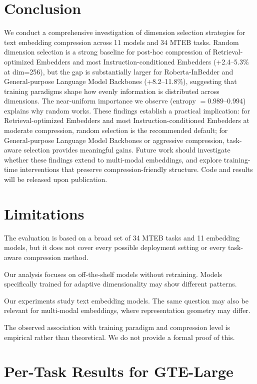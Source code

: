 \documentclass[11pt,a4paper]{article}
\begin{document}
\section{Conclusion}
We conduct a comprehensive investigation of dimension selection strategies for text embedding compression across 11 models and 34 MTEB tasks. Random dimension selection is a strong baseline for post-hoc compression of Retrieval-optimized Embedders and most Instruction-conditioned Embedders (+2.4--5.3\% at dim=256), but the gap is substantially larger for Roberta-InBedder and General-purpose Language Model Backbones (+8.2--11.8\%), suggesting that training paradigms shape how evenly information is distributed across dimensions.
The near-uniform importance we observe (entropy $= 0.989$--$0.994$) explains why random works. These findings establish a practical implication: for Retrieval-optimized Embedders and most Instruction-conditioned Embedders at moderate compression, random selection is the recommended default; for General-purpose Language Model Backbones or aggressive compression, task-aware selection provides meaningful gains. Future work should investigate whether these findings extend to multi-modal embeddings, and explore training-time interventions that preserve compression-friendly structure. Code and results will be released upon publication.

\section{Limitations}
The evaluation is based on a broad set of 34 MTEB tasks and 11 embedding models, but it does not cover every possible deployment setting or every task-aware compression method.

Our analysis focuses on off-the-shelf models without retraining. Models specifically trained for adaptive dimensionality may show different patterns. 

Our experiments study text embedding models. The same question may also be relevant for multi-modal embeddings, where representation geometry may differ. 

The observed association with training paradigm and compression level is empirical rather than theoretical. We do not provide a formal proof of this.



\clearpage
\appendix

\section{Per-Task Results for GTE-Large}
\end{document}
